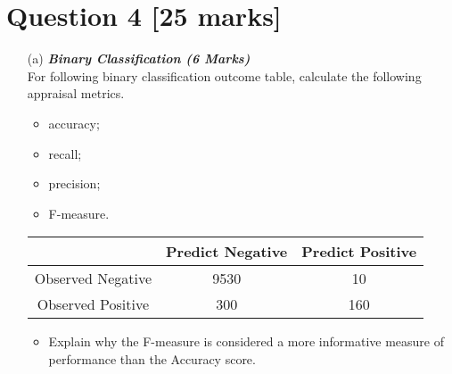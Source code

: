



\newpage
\section*{Question 4 [25 marks]}

\begin{itemize}

\item[(a)] \textbf{\textit{Binary Classification (6 Marks)}}\\
For following binary classification outcome table, calculate the following appraisal metrics.
\begin{itemize}	

\item 	accuracy;

\item 	recall;

\item 	precision;

\item  	F-measure.
\end{itemize}	

\begin{center}
\begin{tabular}{|c|c|c|}
\hline  & \phantom{spa}Predict Negative\phantom{spa} & \phantom{spa}Predict Positive\phantom{spa} \\ 
\hline\phantom{spa} Observed Negative \phantom{spa}&	9530	&	10	\\ 
\hline \phantom{spa}Observed Positive\phantom{spa} & 	300	&	160	\\ 
\hline 
\end{tabular} 
\end{center}

\begin{itemize}	

\item   Explain why the F-measure is considered a more informative measure of performance than the Accuracy score.


\end{itemize}
\end{itemize}
